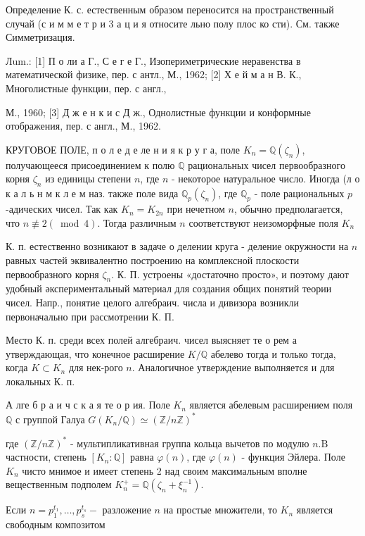 \documentclass[10pt]{article}
\begin{document}
Определение К. с. естественным образом переносится на пространственный случай (с и м м е т р и 3 а ц и я относите льно полу плос ко сти). См. также Симметризация.



Лum.: [1] П о ли а Г., С е г е Г., Изопериметрические неравенства в математической физике, пер. с антл., М., 1962; [2] Х е й м а н В. К., Многолистные функции, пер. с англ.,

М., 1960; [3] Д ж е н к и с Д ж., Однолистные функции и конформные отображения, пер. с англ., М., 1962.



КРУГОВОЕ ПОЛЕ, п о л е д е ле н и я к р у г а, поле $K_{n}=\mathbb{Q}\left(\zeta_{n}\right)$, получающееся присоединением к полю $\mathbb{Q}$ рациональных чисел первообразного корня $\zeta_{n}$ из единицы степени $n$, где $n$ - некоторое натуральное число. Иногда (л о к а л ь н м к л е м наз. также поле вида $\mathbb{Q}_{p}\left(\zeta_{n}\right)$, где $\mathbb{Q}_{p}$ - поле рациональных $p$-адических чисел. Так как $K_{n}=K_{2 n}$ при нечетном $n$, обычно предполагается, что $n \not \equiv 2(\bmod 4)$. Тогда различным $n$ соответствуют неизоморфные поля $K_{n}$



К. п. естественно возникают в задаче о делении круга - деление окружности на $n$ равных частей эквивалентно построению на комплексной плоскости первообразного корня $\zeta_{n}$. К. П. устроены «достаточно просто», и поэтому дают удобный әкспериментальный материал для создания общих понятий теории чисел. Напр., понятие целого алгебраич. числа и дивизора возникли первоначально при рассмотрении К. П.



Место К. п. среди всех полей алгебраич. чисел выясняет те о рем а утверждающая, что конечное расширение $K / \mathbb{Q}$ абелево тогда и только тогда, когда $K \subset K_{n}$ для нек-рого $n$. Аналогичное утверждение выполняется и для локальных К. п.



А лге б р а и ч с к а я те о р ия. Поле $K_{n}$ является абелевым расширением поля $\mathbb{Q}$ с группой Галуа $G\left(K_{n} / \mathbb{Q}\right) \simeq(\mathbb{Z} / n \mathbb{Z})^{*}$



где $(\mathbb{Z} / n \mathbb{Z})^{*}$ - мультипликативная группа кольца вычетов по модулю $n . \mathrm{B}$ частности, степень $\left[K_{n}: \mathbb{Q}\right]$ равна $\varphi(n)$, где $\varphi(n)$ - функция Эйлера. Поле $K_{n}$ чисто мнимое и имеет степень 2 над своим максимальным вполне вещественным подполем $K_{n}^{+}=\mathbb{Q}\left(\zeta_{n}+\xi_{n}^{-1}\right)$.



Если $n=p_{1}^{t_{1}}, \ldots, p_{s}^{t_{s}}-$ разложение $n$ на простые множители, то $K_{n}$ является свободным композитом
\end{document}
